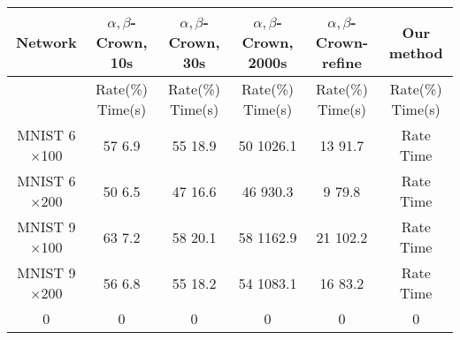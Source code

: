 \begin{tabular}{|c|c|c|c|c|c|}
	\hline
	Network & $\alpha,\beta$-Crown, 10s & $\alpha,\beta$-Crown, 30s & $\alpha,\beta$-Crown, 2000s & $\alpha,\beta$-Crown-refine & Our method \\ \hline
	& Rate(\%) \hfill Time(s) & Rate(\%) \hfill Time(s) & Rate(\%) \hfill Time(s) & Rate(\%) \hfill Time(s) & Rate(\%) \hfill Time(s)\\ \hline
	MNIST 6$\times$100 & 57 \hfill 6.9 & 55 \hfill 18.9 & 50 \hfill 1026.1 & 13 \hfill 91.7 & Rate \hfill Time \\ \hline
	MNIST 6$\times$200 & 50 \hfill 6.5 & 47 \hfill 16.6 & 46 \hfill 930.3 & 9 \hfill 79.8 & Rate \hfill Time \\ \hline
	MNIST 9$\times$100 & 63 \hfill 7.2 & 58 \hfill 20.1 & 58 \hfill 1162.9 & 21 \hfill 102.2 & Rate \hfill Time \\ \hline
	MNIST 9$\times$200 & 56 \hfill 6.8 & 55 \hfill 18.2 & 54 \hfill 1083.1 & 16 \hfill 83.2 & Rate \hfill Time \\ \hline
	0 & 0 & 0 & 0 & 0 & 0 \\ \hline
\end{tabular}